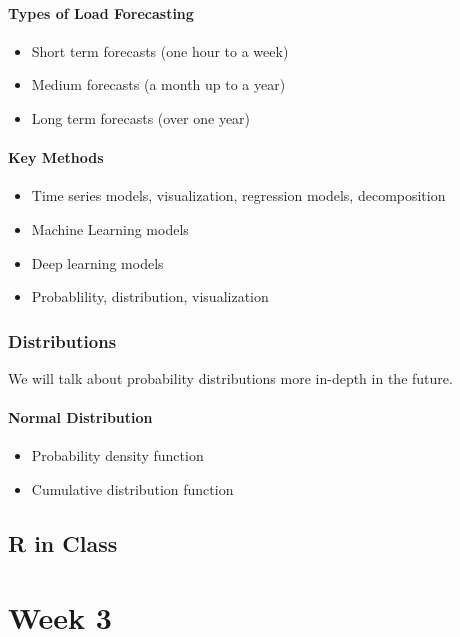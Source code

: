 \documentclass[12pt, a4paper]{report}
\begin{document}
  \subsection{Types of Load Forecasting}

  \begin{itemize}
    \item Short term forecasts (one hour to a week)
    \item Medium forecasts (a month up to a year)
    \item Long term forecasts (over one year)
  \end{itemize}

  \subsection{Key Methods}

  \begin{itemize}
    \item Time series models, visualization, regression models, decomposition
    \item Machine Learning models
    \item Deep learning models
    \item Probablility, distribution, visualization
  \end{itemize}

  \section{Distributions}

  We will talk about probability distributions more in-depth in the future.

  \subsection{Normal Distribution}

  \begin{itemize}
    \item Probability density function
    \item Cumulative distribution function
  \end{itemize}


  \chapter{R in Class}

  \part{Week 3}
\end{document}
